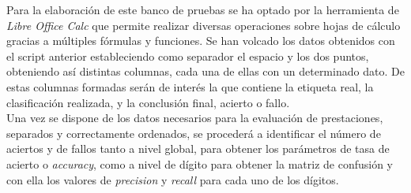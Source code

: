 Para la elaboración de este banco de pruebas se ha optado por la herramienta de \textit{Libre Office Calc} que permite realizar diversas operaciones sobre hojas de cálculo gracias a múltiples fórmulas y funciones. Se han volcado los datos obtenidos con el script anterior estableciendo como separador el espacio y los dos puntos, obteniendo así distintas columnas, cada una de ellas con un determinado dato. De estas columnas formadas serán de interés la que contiene la etiqueta real, la clasificación realizada, y la conclusión final, acierto o fallo.\\

Una vez se dispone de los datos necesarios para la evaluación de prestaciones, separados y correctamente ordenados, se procederá a identificar el número de aciertos y de fallos tanto a nivel global, para obtener los parámetros de tasa de acierto o \textit{accuracy}, como a nivel de dígito para obtener la matriz de confusión y con ella los valores de \textit{precision} y \textit{recall} para cada uno de los dígitos.

